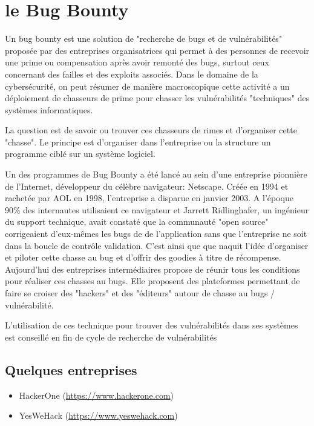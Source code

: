 \section{le Bug Bounty}

Un bug bounty est une solution de "recherche de bugs et de vulnérabilités" proposée par des entreprises organisatrices qui permet à des personnes de recevoir une prime ou compensation après avoir remonté des bugs, surtout ceux concernant des failles et des exploits associés. Dans le domaine de la cybersécurité, on peut résumer de manière macroscopique cette activité  a un déploiement de chasseurs de prime pour chasser les vulnérabilités "techniques" des systèmes informatiques.

La question est de savoir ou trouver ces chasseurs de rimes et d'organiser cette "chasse". Le principe est d'organiser dans l'entreprise ou la structure un programme ciblé sur un système logiciel.

Un des programmes de Bug Bounty  a été lancé au sein d’une entreprise pionnière de l'Internet, développeur du célèbre navigateur: Netscape. Créée en 1994 et rachetée par AOL en 1998, l’entreprise a disparue en janvier 2003.
A l'époque 90\% des internautes utilisaient ce navigateur et Jarrett Ridlinghafer, un ingénieur du support technique, avait constaté que la communauté "open source" corrigeaient d’eux-mêmes les bugs de de l'application sans que l'entreprise ne soit dans la boucle de contrôle validation. C'est ainsi que que naquit l'idée d'organiser et piloter cette chasse au bug et d'offrir des goodies à titre de récompense. 
Aujourd'hui des entreprises intermédiaires propose de réunir tous les conditions pour réaliser ces chasses au bugs.
Elle proposent des plateformes permettant de faire se croiser des "hackers" et des "éditeurs" autour de chasse au bugs / vulnérabilité.

L'utilisation de ces technique pour trouver des vulnérabilités dans ses systèmes est conseillé en fin de cycle de recherche de vulnérabilités

\subsection{Quelques entreprises}

\begin{itemize}
    \item HackerOne (\url{https://www.hackerone.com})
    \item YesWeHack (\url{https://www.yeswehack.com})
\end{itemize}


